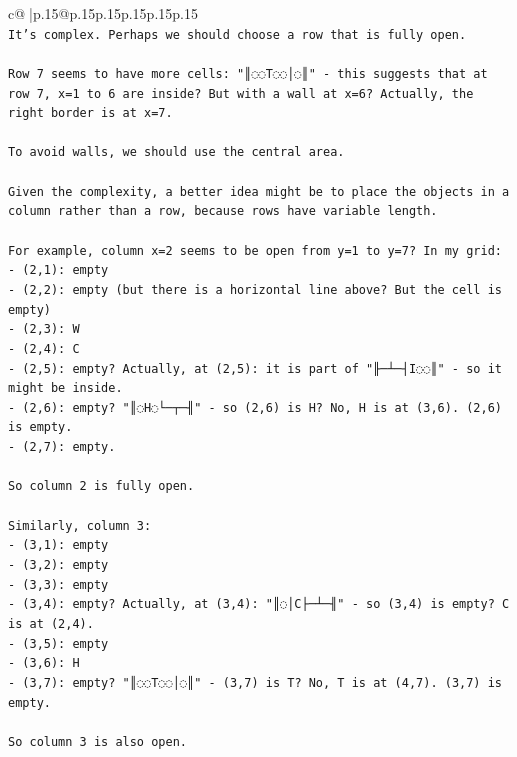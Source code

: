 \documentclass{article}
\begin{document}
{\begin{supertabular}{c@{$\;$}|p{.15\linewidth}@{}p{.15\linewidth}p{.15\linewidth}p{.15\linewidth}p{.15\linewidth}p{.15\linewidth}}
{{{\\ 
\texttt{It's complex. Perhaps we should choose a row that is fully open.} \\
\\ 
\texttt{Row 7 seems to have more cells: "║◌◌T◌◌│◌║" {-} this suggests that at row 7, x=1 to 6 are inside? But with a wall at x=6? Actually, the right border is at x=7.} \\
\\ 
\texttt{To avoid walls, we should use the central area.} \\
\\ 
\texttt{Given the complexity, a better idea might be to place the objects in a column rather than a row, because rows have variable length.} \\
\\ 
\texttt{For example, column x=2 seems to be open from y=1 to y=7? In my grid:} \\
\texttt{{-} (2,1): empty} \\
\texttt{{-} (2,2): empty (but there is a horizontal line above? But the cell is empty)} \\
\texttt{{-} (2,3): W} \\
\texttt{{-} (2,4): C} \\
\texttt{{-} (2,5): empty? Actually, at (2,5): it is part of "╟─┴─┤I◌◌║" {-} so it might be inside.} \\
\texttt{{-} (2,6): empty? "║◌H◌└─┬─╢" {-} so (2,6) is H? No, H is at (3,6). (2,6) is empty.} \\
\texttt{{-} (2,7): empty.} \\
\\ 
\texttt{So column 2 is fully open.} \\
\\ 
\texttt{Similarly, column 3: } \\
\texttt{{-} (3,1): empty} \\
\texttt{{-} (3,2): empty} \\
\texttt{{-} (3,3): empty} \\
\texttt{{-} (3,4): empty? Actually, at (3,4): "║◌│C├─┴─╢" {-} so (3,4) is empty? C is at (2,4).} \\
\texttt{{-} (3,5): empty} \\
\texttt{{-} (3,6): H} \\
\texttt{{-} (3,7): empty? "║◌◌T◌◌│◌║" {-} (3,7) is T? No, T is at (4,7). (3,7) is empty.} \\
\\ 
\texttt{So column 3 is also open.} \\
}}}
\end{supertabular}}
\end{document}
